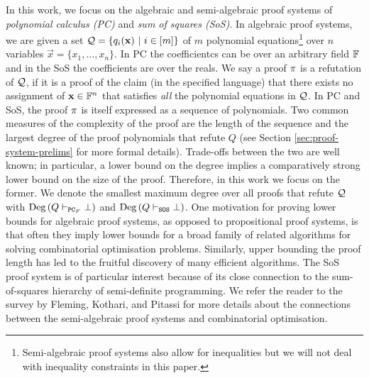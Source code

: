 \documentclass[11pt]{article}
\begin{document}
In this work, we focus on the algebraic and semi-algebraic proof systems of \emph{polynomial calculus (PC)} and \emph{sum of squares (SoS)}. %
In algebraic proof systems, we are given a set $\mathcal{Q} =\{q_i(\mathbf{x}) \text{ } |\text{ } i \in [m] \}$ of $m$ polynomial equations\footnote{Semi-algebraic proof systems also allow for inequalities but we will not deal with inequality constraints in this paper.} over $n$ variables $\vec{x} = \{x_1, \dots, x_n\}$.
In PC the coefficientcs can be over an arbitrary field $\mathbb{F}$ and in the SoS the coefficients are  over the reals.
We say a proof $\pi$ is a refutation of $\mathcal{Q}$, if it is a proof of the claim (in the specified language) that there exists no assignment of $\mathbf{x} \in \mathbb{F}^n$ that satisfies \emph{all} the polynomial equations in $\mathcal{Q}$.
In PC and SoS, the proof $\pi$ is itself expressed as a sequence of polynomials. Two common measures of the complexity of the proof are the length of the sequence and the largest degree of the proof polynomials that refute $Q$ (see Section \ref{sec:proof-system-prelims} for more formal details). Trade-offs between the two are well known; in particular, a lower bound on the degree implies a comparatively strong lower bound on the size of the proof. Therefore, in this work we focus on the former. We denote the smallest maximum degree over all proofs that refute $\mathcal{Q}$ with $\text{Deg}\left(Q \vdash_{\texttt{PC}_F} \bot\right)$ and $\text{Deg}\left(Q \vdash_{\texttt{SOS}} \bot\right)$. One motivation for proving lower bounds for algebraic proof systems, as opposed to propositional proof systems, is that often they imply lower bounds for a broad family of related algorithms for solving combinatorial optimisation problems.
Similarly, upper bounding the proof length has led to the fruitful discovery of many efficient algorithms.
The SoS proof system is of particular interest because of its close connection to the sum-of-squares hierarchy of semi-definite programming.
We refer the reader to the survey by Fleming, Kothari, and Pitassi \cite{fleming2019semialgebraic} for more details about the connections between the semi-algebraic proof systems and combinatorial optimisation.
\end{document}
